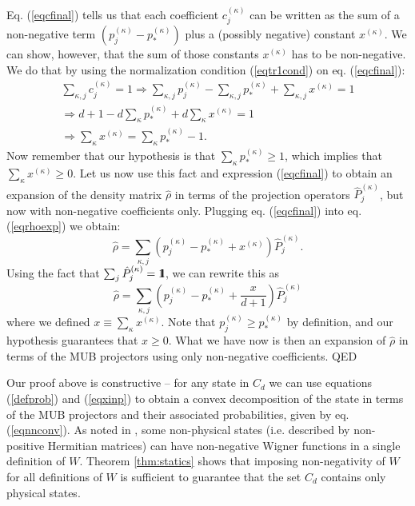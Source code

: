 \documentclass[aps,twocolumn,showpacs,nofootinbib,superscriptaddress]{revtex4}
\newcommand{\QED}{\hfill QED}
\begin{document}
Eq. (\ref{eqcfinal}) tells us that each coefficient
$c_{j}^{(\kappa)}$ can be written as the sum of a non-negative
term $\left( p_{j}^{(\kappa)}-p_{*}^{(\kappa)}\right)$ plus a
(possibly negative) constant $x^{(\kappa)}$. We can show, however,
that the sum of those constants $x^{(\kappa)}$ has to be
non-negative. We do that by using the normalization condition
(\ref{eqtr1cond}) on eq. (\ref{eqcfinal}):
\begin{eqnarray}
\sum_{\kappa,j}c_{j}^{(\kappa)}=1 \Rightarrow \sum_{\kappa,j}p_{j}^{(\kappa)}-\sum_{\kappa,j}p_{*}^{(\kappa)}+\sum_{\kappa,j}x^{(\kappa)} =1\nonumber\\
\Rightarrow d+1-d\sum_{\kappa}p_{*}^{(\kappa)}+d\sum_{\kappa}x^{(\kappa)}=1\nonumber\\
\Rightarrow \sum_{\kappa}
x^{(\kappa)}=\sum_{\kappa}p_{*}^{(\kappa)}-1\label{eqxinp}.
\end{eqnarray}
Now remember that our hypothesis is that $\sum_{\kappa}
p_{*}^{(\kappa)}\ge 1$, which implies that $\sum_{\kappa}
x^{(\kappa)} \ge 0$. Let us now use this fact and expression
(\ref{eqcfinal}) to obtain an expansion of the density matrix
$\hat{\rho}$ in terms of the projection operators
$\hat{P}_{j}^{(\kappa)}$, but now with non-negative coefficients
only. Plugging eq. (\ref{eqcfinal}) into eq. (\ref{eqrhoexp}) we
obtain:
\begin{equation}
\hat{\rho}=\sum_{\kappa,j}
(p_{j}^{(\kappa)}-p_{*}^{(\kappa)}+x^{(\kappa)})\hat{P}_{j}^{(\kappa)}.
\end{equation}
Using the fact that $\sum_j \hat{P}_j^{(\kappa)}=\mbox{$1
\hspace{-1.0mm}  {\bf l}$}$, we can rewrite this as
\begin{equation}
\hat{\rho}=\sum_{\kappa,j}\left(p_{j}^{(\kappa)}-p_{*}^{(\kappa)}+\frac{x}{d+1}\right)\hat{P}_{j}^{(\kappa)}\label{eqnnconv}
\end{equation}
where we defined $x\equiv \sum_{\kappa} x^{(\kappa)}$. Note that
$p_{j}^{(\kappa)} \ge p_{*}^{(\kappa)}$ by definition, and our
hypothesis guarantees that $x\ge 0$. What we have now is then an
expansion of $\hat{\rho}$ in terms of the MUB projectors using
only non-negative coefficients. \QED
\medskip

Our proof above is constructive -- for any state in $C_d$ we can use equations (\ref{defprob}) and (\ref{eqxinp}) to obtain a convex
decomposition of the state in terms of the MUB projectors and their associated probabilities, given
by eq. (\ref{eqnnconv}). As noted in \cite{Galvao05}, some non-physical states
(i.e. described by non-positive Hermitian matrices) can have non-negative
Wigner functions in a single definition of $W$. Theorem \ref{thm:statics}
shows that imposing non-negativity of $W$ for all definitions of $W$ is
sufficient to guarantee that the set $C_d$ contains only physical states.
\end{document}
